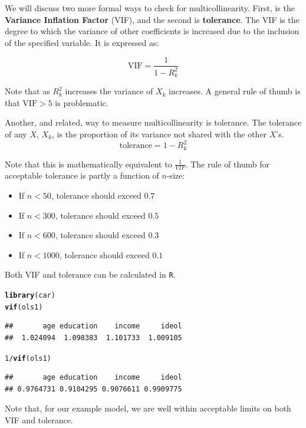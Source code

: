 \documentclass[11pt,openany]{book}
\makeatletter
\newcommand{\hlnum}[1]{\textcolor[rgb]{0.686,0.059,0.569}{#1}}%
\newcommand{\hlopt}[1]{\textcolor[rgb]{0,0,0}{#1}}%
\newcommand{\hlstd}[1]{\textcolor[rgb]{0.345,0.345,0.345}{#1}}%
\newcommand{\hlkwd}[1]{\textcolor[rgb]{0.737,0.353,0.396}{\textbf{#1}}}%
\newenvironment{kframe}{%
 \def\at@end@of@kframe{}%
 \ifinner\ifhmode%
  \def\at@end@of@kframe{\end{minipage}}%
  \begin{minipage}{\columnwidth}%
 \fi\fi%
 \def\FrameCommand##1{\hskip\@totalleftmargin \hskip-\fboxsep
 \colorbox{shadecolor}{##1}\hskip-\fboxsep
     \hskip-\linewidth \hskip-\@totalleftmargin \hskip\columnwidth}%
 \MakeFramed {\advance\hsize-\width
   \@totalleftmargin\z@ \linewidth\hsize
   \@setminipage}}%
 {\par\unskip\endMakeFramed%
 \at@end@of@kframe}
\newenvironment{knitrout}{}{} %
\renewenvironment{knitrout}{\begin{singlespace}}{\end{singlespace}}
\makeatother
\begin{document}
We will discuss two more formal ways to check for multicollinearity. First, is the  \textbf{Variance Inflation Factor} (VIF), and the second is \textbf{tolerance}. The VIF is the  degree to which the variance of other coefficients is increased due to the inclusion of the specified variable. It is expressed as: 

\begin{equation}
  \label{eq:vif}
  \text{VIF} = \frac{1}{1-R^2_k}
\end{equation}

\noindent Note that as $R^2_k$ increases the variance of $X_k$ increases. A general rule of thumb is that $\text{VIF} > 5$ is problematic. 

Another, and related, way to measure multicollinearity is tolerance. The tolerance of any $X$, $X_k$, is the proportion of its variance not shared with the other $X$'s. 
\begin{equation}
  \label{eq:tolerance}
  \text{tolerance} = 1-R^2_k 
\end{equation}

\noindent Note that this is mathematically equivalent to $\frac{1}{VIF}$. The rule of thumb for acceptable tolerance is partly a function of $n$-size:

 
\begin{itemize}
\item If $n < 50$, tolerance should exceed $0.7$
\item If $n < 300$, tolerance should exceed $0.5$
\item If $n < 600$, tolerance should exceed $0.3$
\item If $n < 1000$, tolerance should exceed $0.1$
\end{itemize}



Both VIF and tolerance can be calculated in \texttt{R}. 
\begin{knitrout}
\color{fgcolor}\begin{kframe}
\begin{alltt}
\hlkwd{library}\hlstd{(car)}
\hlkwd{vif}\hlstd{(ols1)}
\end{alltt}
\begin{verbatim}
##       age education    income     ideol 
##  1.024094  1.098383  1.101733  1.009105
\end{verbatim}
\begin{alltt}
\hlnum{1}\hlopt{/}\hlkwd{vif}\hlstd{(ols1)}
\end{alltt}
\begin{verbatim}
##       age education    income     ideol 
## 0.9764731 0.9104295 0.9076611 0.9909775
\end{verbatim}
\end{kframe}
\end{knitrout}
\noindent Note that, for our example model, we are well within acceptable limits on both VIF and tolerance. 
\end{document}
